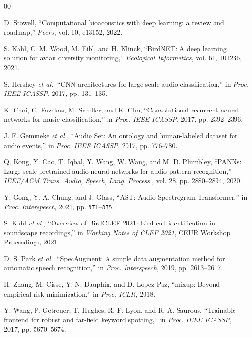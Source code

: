 \documentclass[conference]{IEEEtran}
\begin{document}
\begin{thebibliography}{00}

 D. Stowell, ``Computational bioacoustics with deep learning: a review and roadmap,'' \textit{PeerJ}, vol. 10, e13152, 2022.

 S. Kahl, C. M. Wood, M. Eibl, and H. Klinck, ``BirdNET: A deep learning solution for avian diversity monitoring,'' \textit{Ecological Informatics}, vol. 61, 101236, 2021.

 S. Hershey \textit{et al.}, ``CNN architectures for large-scale audio classification,'' in \textit{Proc. IEEE ICASSP}, 2017, pp. 131--135.

 K. Choi, G. Fazekas, M. Sandler, and K. Cho, ``Convolutional recurrent neural networks for music classification,'' in \textit{Proc. IEEE ICASSP}, 2017, pp. 2392--2396.

 J. F. Gemmeke \textit{et al.}, ``Audio Set: An ontology and human-labeled dataset for audio events,'' in \textit{Proc. IEEE ICASSP}, 2017, pp. 776--780.

 Q. Kong, Y. Cao, T. Iqbal, Y. Wang, W. Wang, and M. D. Plumbley, ``PANNs: Large-scale pretrained audio neural networks for audio pattern recognition,'' \textit{IEEE/ACM Trans. Audio, Speech, Lang. Process.}, vol. 28, pp. 2880--2894, 2020.

 Y. Gong, Y.-A. Chung, and J. Glass, ``AST: Audio Spectrogram Transformer,'' in \textit{Proc. Interspeech}, 2021, pp. 571--575.

 S. Kahl \textit{et al.}, ``Overview of BirdCLEF 2021: Bird call identification in soundscape recordings,'' in \textit{Working Notes of CLEF 2021}, CEUR Workshop Proceedings, 2021.

 D. S. Park \textit{et al.}, ``SpecAugment: A simple data augmentation method for automatic speech recognition,'' in \textit{Proc. Interspeech}, 2019, pp. 2613--2617.

 H. Zhang, M. Cisse, Y. N. Dauphin, and D. Lopez-Paz, ``mixup: Beyond empirical risk minimization,'' in \textit{Proc. ICLR}, 2018.

 Y. Wang, P. Getreuer, T. Hughes, R. F. Lyon, and R. A. Saurous, ``Trainable frontend for robust and far-field keyword spotting,'' in \textit{Proc. IEEE ICASSP}, 2017, pp. 5670--5674.


\end{thebibliography}
\end{document}
